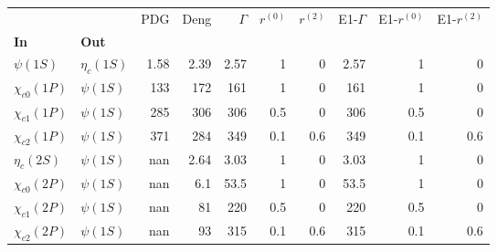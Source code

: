 \begin{tabular}{l|l|r|r|r|r|r|r|r|r}
\toprule
                &            &  PDG &  Deng &  $\Gamma$ &  $r^{(0)}$ &  $r^{(2)}$ &  E1-$\Gamma$ &  E1-$r^{(0)}$ &  E1-$r^{(2)}$ \\
\textbf{In} & \textbf{Out} &      &       &           &            &            &              &               &               \\
\midrule
\textbf{$\psi(1S)$} & \textbf{$\eta_{c}(1S)$} & 1.58 &  2.39 &      2.57 &          1 &          0 &         2.57 &             1 &             0 \\
\textbf{$\chi_{c0}(1P)$} & \textbf{$\psi(1S)$} &  133 &   172 &       161 &          1 &          0 &          161 &             1 &             0 \\
\textbf{$\chi_{c1}(1P)$} & \textbf{$\psi(1S)$} &  285 &   306 &       306 &        0.5 &          0 &          306 &           0.5 &             0 \\
\textbf{$\chi_{c2}(1P)$} & \textbf{$\psi(1S)$} &  371 &   284 &       349 &        0.1 &        0.6 &          349 &           0.1 &           0.6 \\
\textbf{$\eta_{c}(2S)$} & \textbf{$\psi(1S)$} &  nan &  2.64 &      3.03 &          1 &          0 &         3.03 &             1 &             0 \\
\textbf{$\chi_{c0}(2P)$} & \textbf{$\psi(1S)$} &  nan &   6.1 &      53.5 &          1 &          0 &         53.5 &             1 &             0 \\
\textbf{$\chi_{c1}(2P)$} & \textbf{$\psi(1S)$} &  nan &    81 &       220 &        0.5 &          0 &          220 &           0.5 &             0 \\
\textbf{$\chi_{c2}(2P)$} & \textbf{$\psi(1S)$} &  nan &    93 &       315 &        0.1 &        0.6 &          315 &           0.1 &           0.6 \\
\bottomrule
\end{tabular}
